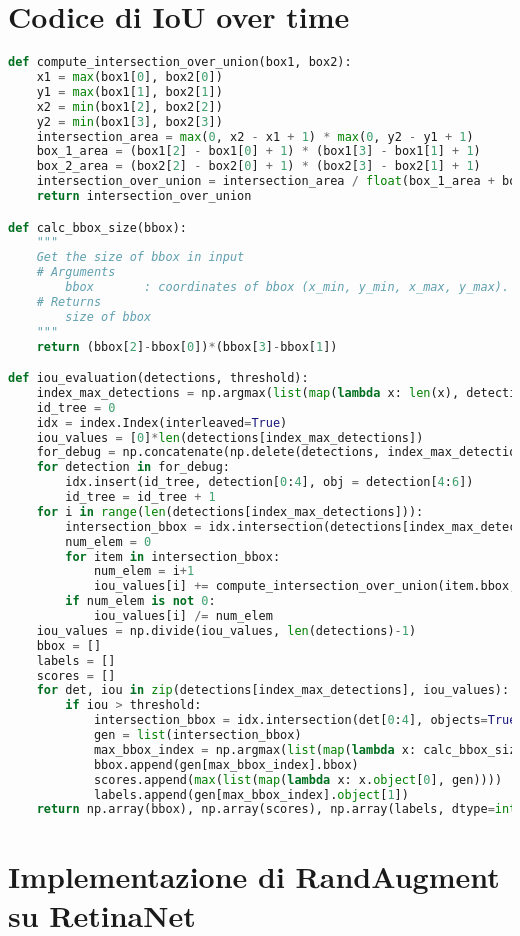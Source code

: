 \chapter{Codice di IoU over time}
\begin{lstlisting}[caption={Algoritmo di IoU over time in Python}, language=Python, basicstyle=\tiny,label=code:ioutime]
def compute_intersection_over_union(box1, box2):
    x1 = max(box1[0], box2[0])
    y1 = max(box1[1], box2[1])
    x2 = min(box1[2], box2[2])
    y2 = min(box1[3], box2[3])
    intersection_area = max(0, x2 - x1 + 1) * max(0, y2 - y1 + 1)
    box_1_area = (box1[2] - box1[0] + 1) * (box1[3] - box1[1] + 1)
    box_2_area = (box2[2] - box2[0] + 1) * (box2[3] - box2[1] + 1)
    intersection_over_union = intersection_area / float(box_1_area + box_2_area - intersection_area)
    return intersection_over_union

def calc_bbox_size(bbox):
    """
    Get the size of bbox in input
    # Arguments
        bbox       : coordinates of bbox (x_min, y_min, x_max, y_max).
    # Returns
        size of bbox
    """
    return (bbox[2]-bbox[0])*(bbox[3]-bbox[1])

def iou_evaluation(detections, threshold):
    index_max_detections = np.argmax(list(map(lambda x: len(x), detections)))
    id_tree = 0
    idx = index.Index(interleaved=True)
    iou_values = [0]*len(detections[index_max_detections])
    for_debug = np.concatenate(np.delete(detections, index_max_detections, axis = 0))
    for detection in for_debug:
        idx.insert(id_tree, detection[0:4], obj = detection[4:6])
        id_tree = id_tree + 1
    for i in range(len(detections[index_max_detections])):
        intersection_bbox = idx.intersection(detections[index_max_detections][i][0:4], objects=True)
        num_elem = 0
        for item in intersection_bbox:
            num_elem = i+1
            iou_values[i] += compute_intersection_over_union(item.bbox, detections[index_max_detections][i][0:4])
        if num_elem is not 0:
            iou_values[i] /= num_elem
    iou_values = np.divide(iou_values, len(detections)-1)
    bbox = []
    labels = []
    scores = []
    for det, iou in zip(detections[index_max_detections], iou_values):
        if iou > threshold:
            intersection_bbox = idx.intersection(det[0:4], objects=True)
            gen = list(intersection_bbox)
            max_bbox_index = np.argmax(list(map(lambda x: calc_bbox_size(x), list(map(lambda x: x.bbox, gen)))))
            bbox.append(gen[max_bbox_index].bbox)
            scores.append(max(list(map(lambda x: x.object[0], gen))))
            labels.append(gen[max_bbox_index].object[1])
    return np.array(bbox), np.array(scores), np.array(labels, dtype=int)
\end{lstlisting}
\chapter{Implementazione di RandAugment su RetinaNet}
